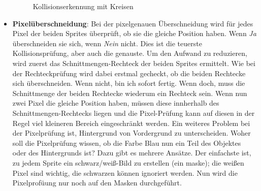 \begin{itemize}
\begin{figure}[H]
\begin{center}
\caption{Kollisionserkennung mit Kreisen}\label{picKollKreis01}
\end{center}
\end{figure}

    \item \textbf{Pixelüberschneidung}: Bei der pixelgenauen Überschneidung wird für jedes Pixel der beiden Sprites überprüft, ob sie die gleiche Position haben. Wenn \emph{Ja} überschneiden sie sich, wenn \emph{Nein} nicht. Dies ist die teuerste Kollisionsprüfung, aber auch die genauste. Um den Aufwand zu reduzieren, wird zuerst das Schnittmengen-Rechteck der beiden Sprites ermittelt. Wie bei der Rechteckprüfung wird dabei erstmal gecheckt, ob die beiden Rechtecke sich überschneiden. Wenn nicht, bin ich sofort fertig. Wenn doch, muss die Schnittmenge der beiden Rechtecke wiederum ein Rechteck sein. Wenn nun zwei Pixel die gleiche Position haben, müssen diese innherhalb des Schnittmengen-Rechtecks liegen und die Pixel-Prüfung kann auf diesen in der Regel viel kleineren Bereich eingeschränkt werden. Ein weiteres Problem bei der Pixelprüfung ist, Hintergrund von Vordergrund zu unterscheiden. Woher soll die Pixelprüfung wissen, ob die Farbe Blau nun ein Teil des Objektes oder des Hintergrunds ist? Dazu gibt es mehrere Ansätze. Der einfachste ist, zu jedem Sprite ein schwarz/weiß-Bild zu erstellen (ein \gls{maske}); die weißen Pixel sind wichtig, die schwarzen können ignoriert werden. Nun wird die Pixelprofüung nur noch auf den Masken durchgeführt.

\end{itemize}

